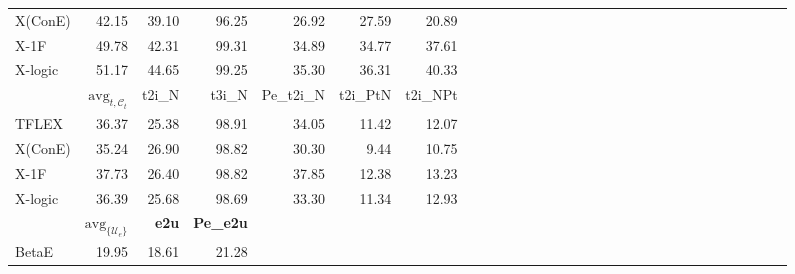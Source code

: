 \begin{table*}
{\begin{tabular}{lrrrrrrrrrrrrrrrrrrrrrrrrrrrrr }
      X(ConE)        & 42.15                            & 39.10            & 96.25            & 26.92               & 27.59             & 20.89                                                                         \\
      X-1F           & 49.78                            & 42.31            & 99.31            & 34.89               & 34.77             & 37.61                                                                         \\
      X-logic        & 51.17                            & 44.65            & 99.25            & 35.30               & 36.31             & 40.33                                                                         \\
      \midrule
      \midrule
                     & $\text{avg}_{t, \mathcal{C}_t}$  & t2i\_N           & t3i\_N           & Pe\_t2i\_N          & t2i\_PtN          & t2i\_NPt                                                                      \\
      \midrule
      TFLEX          & 36.37                            & 25.38            & 98.91            & 34.05               & 11.42             & 12.07                                                                         \\
      X(ConE)        & 35.24                            & 26.90            & 98.82            & 30.30               & 9.44              & 10.75                                                                         \\
      X-1F           & 37.73                            & 26.40            & 98.82            & 37.85               & 12.38             & 13.23                                                                         \\
      X-logic        & 36.39                            & 25.68            & 98.69            & 33.30               & 11.34             & 12.93                                                                         \\
      \midrule
      \midrule
                     & $\text{avg}_{\{\mathcal{U}_e\}}$ & \textbf{e2u}     & \textbf{Pe\_e2u}                                                                                                                           \\
      \midrule
      BetaE          & 19.95                            & 18.61            & 21.28                                                                                                                                      \\

\end{tabular}}
\end{table*}
